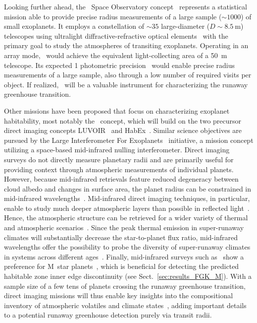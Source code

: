\documentclass[twocolumn,twocolappendix]{aastex631}
\begin{document}
Looking further ahead, the \nautilus\ Space Observatory concept~\citep{Apai2019} represents a statistical mission able to provide precise radius measurements of a large sample ($\sim \num{1000}$) of small exoplanets.
It employs a constellation of $\sim \num{35}$ large-diameter ($D \sim \SI{8.5}{\meter}$) telescopes using ultralight diffractive-refractive optical elements~\citep{Milster2020} with the primary goal to study the atmospheres of transiting exoplanets.
Operating in an array mode, \nautilus\ would achieve the equivalent light-collecting area of a \SI{50}{\meter} telescope.
Its expected \SI{1}{\ppm} photometric precision~\citep{Apai2022} would enable precise radius measurements of a large sample, also through a low number of required visits per object.
If realized, \nautilus\ will be a valuable instrument for characterizing the runaway greenhouse transition.

Other missions have been proposed that focus on characterizing exoplanet habitability, most notably the \hwo\ concept, which will build on the two precursor direct imaging concepts LUVOIR~\citep{LUVOIR2019} and HabEx~\citep{Gaudi2020c}.
Similar science objectives are pursued by the Large Interferometer For Exoplanets~\citep[\life,][]{Quanz2022} initiative, a mission concept utilizing a space-based mid-infrared nulling interferometer.
Direct imaging surveys do not directly measure planetary radii and are primarily useful for providing context through atmospheric measurements of individual planets.
However, because mid-infrared retrievals feature reduced degeneracy between cloud albedo and changes in surface area, the planet radius can be constrained in mid-infrared wavelengths~\citep{2018ExA....46..543D,2021ExA...tmp..118Q}.
Mid-infrared direct imaging techniques, in particular, enable to study much deeper atmospheric layers than possible in reflected light~\citep{Wordsworth2022}.
Hence, the atmospheric structure can be retrieved for a wider variety of thermal and atmospheric scenarios~\citep{Alei2022,Konrad2022}.
Since the peak thermal emission in super-runaway climates will substantially decrease the star-to-planet flux ratio, mid-infrared wavelengths offer the possibility to probe the diversity of super-runaway climates in systems across different ages~\citep{2014ApJ...784...27L,2019A&A...621A.125B}.
Finally, mid-infrared surveys such as \life\ show a preference for M~star planets~\citep{Quanz2022}, which is beneficial for detecting the predicted habitable zone inner edge discontinuity (see Sect.~\ref{sec:results_FGK_M}).
With a sample size of a few tens of planets crossing the runaway greenhouse transition, direct imaging missions will thus enable key insights into the compositional inventory of atmospheric volatiles and climate states~\citep{2021exbi.book....5H,2022arXiv220505696C}, adding important details to a potential runaway greenhouse detection purely via transit radii.
\end{document}
